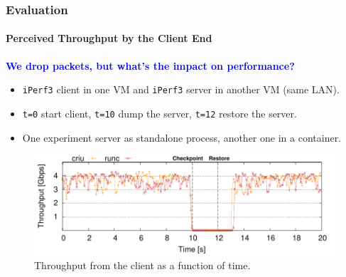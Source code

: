 \documentclass[9pt,    %
    english,            %
    xcolor=table,       %
    envcountsect,        %
    aspectratio=169     %
]{beamer}
\begin{document}
\begin{frame}
    \frametitle{Evaluation}
    \framesubtitle{Perceived Throughput by the Client End}

    \vspace{10pt}

    \textbf{\textcolor{blue}{We drop packets, but what's the impact on performance?}}
    \begin{itemize}
        \item \texttt{iPerf3} client in one VM and \texttt{iPerf3} server in another VM (same LAN).
        \item \texttt{t=0} start client, \texttt{t=10} dump the server, \texttt{t=12} restore the server.
        \item One experiment server as standalone process, another one in a container.
    \end{itemize}

    \vspace{-5pt}

    \begin{figure}
        \centering
        \includegraphics[width=.75\textwidth]{./images/tcp_established_downtime_microbenchmark.pdf}
        \caption{Throughput from the client as a function of time.\label{fig:evaluation-downtime}}
    \end{figure}
    
\end{frame}
\end{document}
